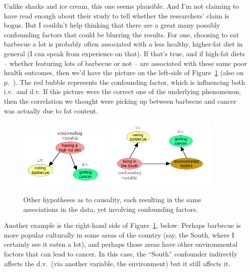 Unlike sharks and ice cream, this one seems plausible. And I'm not claiming to
have read enough about their study to tell whether the researchers' claim is
bogus. But I couldn't help thinking that there are a great many possibly
confounding factors that could be blurring the results. For one, choosing to
eat barbecue a lot is probably often associated with a less healthy, higher-fat
diet in general (I can speak from experience on that). If that's true, and if
high-fat diets -- whether featuring lots of barbecue or not -- are associated
with these same poor health outcomes, then we'd have the picture on the
left-side of Figure~\ref{fig:causalDiagram23} (also on
p.~\pageref{fig:causalDiagram23}). The red bubble represents the confounding
factor, which is influencing both i.v.~and d.v. If this picture were the
correct one of the underlying phenomenon, then the correlation we thought were
picking up between barbecue and cancer was actually due to fat content.

\begin{figure}[hb]
\centering
\includegraphics[width=0.4\textwidth]{causalDiagram2.png}
\includegraphics[width=0.5\textwidth]{causalDiagram3.png}
\caption{Other hypotheses as to causality, each resulting in the same
associations in the data, yet involving confounding factors.}
\label{fig:causalDiagram23}
\end{figure}


Another example is the right-hand side of Figure~\ref{fig:causalDiagram23},
below. Perhaps barbecue is more popular culturally in some areas of the country
(say, the South, where I certainly see it eaten a lot), and perhaps those areas
have other environmental factors that can lead to cancer. In this case, the
``South'' confounder indirectly affects the d.v.~(via another variable, the
environment) but it still affects it.


